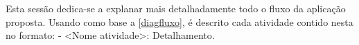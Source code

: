 Esta sessão dedica-se a explanar mais detalhadamente todo o fluxo da aplicação proposta. Usando como base a \autoref{diagfluxo}, é descrito cada atividade contido nesta no formato: - <Nome atividade>: Detalhamento.
